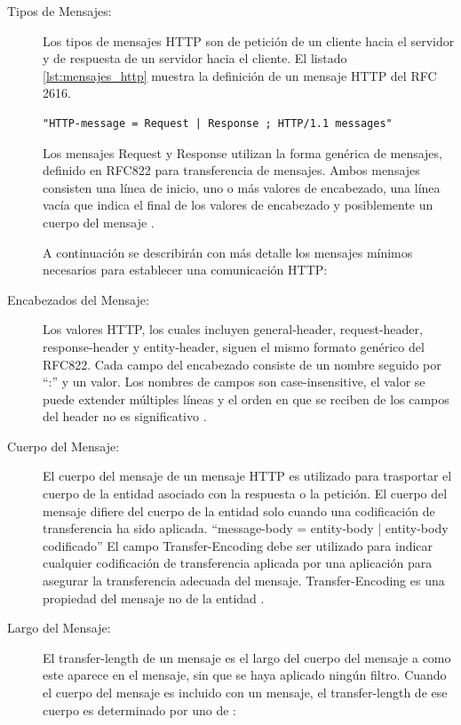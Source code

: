 \begin{description}
\item[Tipos de Mensajes:] 

Los tipos de mensajes HTTP son de petición de un cliente hacia el servidor y de respuesta de un servidor hacia el cliente. El listado \ref{lst:mensajes_http} muestra la definición de un mensaje HTTP del RFC 2616. 

\begin{lstlisting}[caption={Tipos de mensajes HTTP},label={lst:mensajes_http}]
"HTTP-message = Request | Response ; HTTP/1.1 messages"
\end{lstlisting}

Los mensajes Request y Response utilizan la forma genérica de mensajes, definido en RFC822 para transferencia de mensajes. Ambos mensajes consisten una línea de inicio, uno o más valores de encabezado, una línea vacía que indica el final de los valores de encabezado y posiblemente un cuerpo del mensaje \cite{rfc2616}.

A continuación se describirán con más detalle los mensajes mínimos necesarios para establecer una comunicación HTTP: 

\item[Encabezados del Mensaje:] 
Los valores HTTP, los cuales incluyen general-header, request-header, response-header y entity-header, siguen el mismo formato genérico del RFC822. Cada campo del encabezado consiste de un nombre seguido por “:” y un valor. Los nombres de campos son case-insensitive, el valor se puede extender múltiples líneas y el orden en que se reciben de los campos del header no es significativo \cite{rfc2616}.

\item[Cuerpo del Mensaje:] 

El cuerpo del mensaje de un mensaje HTTP es utilizado para trasportar el cuerpo de la entidad asociado con la respuesta o la petición. El cuerpo del mensaje difiere del cuerpo de la entidad solo cuando una codificación de transferencia ha sido aplicada. “message-body = entity-body | entity-body codificado”  
El campo Transfer-Encoding debe ser utilizado para indicar cualquier codificación de transferencia aplicada por una aplicación para asegurar la transferencia adecuada del mensaje. Transfer-Encoding es una propiedad del mensaje no de la entidad \cite{rfc2616}.

\item[Largo del Mensaje:] 

El transfer-length de un mensaje es el largo del cuerpo del mensaje a como este aparece en el mensaje, sin que se haya aplicado ningún filtro. Cuando el cuerpo del mensaje es incluido con un mensaje, el transfer-length de ese cuerpo es determinado por uno de \cite{rfc2616}: 
\begin{itemize}


\end{itemize}
\end{description}
